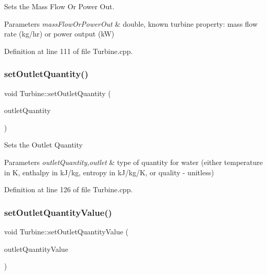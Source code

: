 Sets the Mass Flow Or Power Out. 


\begin{DoxyParams}{Parameters}
{\em mass\+Flow\+Or\+Power\+Out} & double, known turbine property\+: mass flow rate (kg/hr) or power output (kW) \\
\hline
\end{DoxyParams}


Definition at line 111 of file Turbine.\+cpp.

\mbox{\label{class_turbine_ad5ff4ba1657aac9519a6841336ec571c}} 
\subsubsection{\texorpdfstring{set\+Outlet\+Quantity()}{setOutletQuantity()}}
{\footnotesize\ttfamily void Turbine\+::set\+Outlet\+Quantity (\begin{DoxyParamCaption}\item[{\hyperlink{class_steam_properties_ae0294bedf7d178c2d8fb6aed0f62fbff}{Steam\+Properties\+::\+Thermodynamic\+Quantity}}]{outlet\+Quantity }\end{DoxyParamCaption})}

Sets the Outlet Quantity


\begin{DoxyParams}{Parameters}
{\em outlet\+Quantity,outlet} & type of quantity for water (either temperature in K, enthalpy in k\+J/kg, entropy in k\+J/kg/K, or quality -\/ unitless) \\
\hline
\end{DoxyParams}


Definition at line 126 of file Turbine.\+cpp.

\mbox{\label{class_turbine_ab37326068f633280de8f8144b9c8eb89}} 
\subsubsection{\texorpdfstring{set\+Outlet\+Quantity\+Value()}{setOutletQuantityValue()}}
{\footnotesize\ttfamily void Turbine\+::set\+Outlet\+Quantity\+Value (\begin{DoxyParamCaption}\item[{double}]{outlet\+Quantity\+Value }\end{DoxyParamCaption})}

